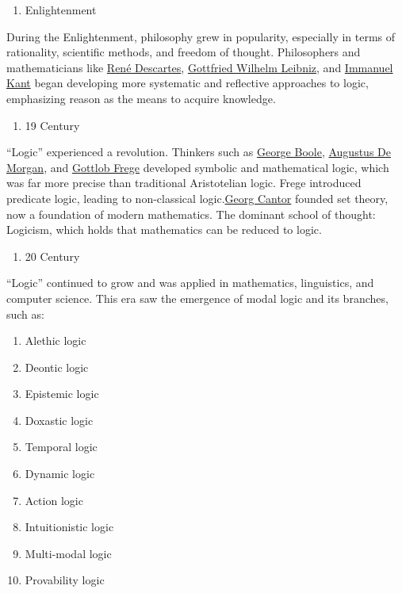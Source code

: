 \begin{enumerate}
\def\labelenumi{\alph{enumi})}
\tightlist
\item
  Enlightenment
\end{enumerate}

During the Enlightenment, philosophy grew in popularity, especially in
terms of rationality, scientific methods, and freedom of thought.
Philosophers and mathematicians like
\href{https://en.wikipedia.org/wiki/Ren\%C3\%A9_Descartes}{René
Descartes},
\href{https://en.wikipedia.org/wiki/Gottfried_Wilhelm_Leibniz}{Gottfried
Wilhelm Leibniz}, and
\href{https://en.wikipedia.org/wiki/Immanuel_Kant}{Immanuel Kant} began
developing more systematic and reflective approaches to logic,
emphasizing reason as the means to acquire knowledge.

\begin{enumerate}
\def\labelenumi{\alph{enumi})}
\setcounter{enumi}{1}
\tightlist
\item
  19 Century
\end{enumerate}

``Logic'' experienced a revolution. Thinkers such as
\href{https://simple.wikipedia.org/wiki/George_Boole}{George Boole},
\href{https://en.wikipedia.org/wiki/Augustus_De_Morgan}{Augustus De
Morgan}, and \href{https://id.wikipedia.org/wiki/Gottlob_Frege}{Gottlob
Frege} developed symbolic and mathematical logic, which was far more
precise than traditional Aristotelian logic. Frege introduced predicate
logic, leading to non-classical
logic.\href{https://id.wikipedia.org/wiki/Georg_Cantor}{Georg Cantor}
founded set theory, now a foundation of modern mathematics. The dominant
school of thought: Logicism, which holds that mathematics can be reduced
to logic.

\begin{enumerate}
\def\labelenumi{\alph{enumi})}
\setcounter{enumi}{2}
\tightlist
\item
  20 Century
\end{enumerate}

``Logic'' continued to grow and was applied in mathematics, linguistics,
and computer science. This era saw the emergence of modal logic and its
branches, such as:

\begin{enumerate}
\def\labelenumi{\arabic{enumi})}
\tightlist
\item
  Alethic logic\\
\item
  Deontic logic\\
\item
  Epistemic logic\\
\item
  Doxastic logic
\item
  Temporal logic
\item
  Dynamic logic
\item
  Action logic
\item
  Intuitionistic logic
\item
  Multi-modal logic
\item
  Provability logic
\end{enumerate}

